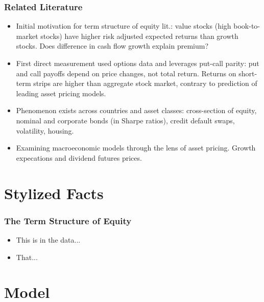 \begin{frame}
  \frametitle{Related Literature}
  \begin{itemize}
  \item Initial motivation for term structure of equity lit.: value stocks (high book-to-market stocks) have higher risk adjusted expected returns than growth stocks. Does difference in cash flow growth explain premium?
  \\ 
  \item First direct measurement used options data and leverages put-call parity: put and call payoffs depend on price changes, not total return. Returns on short-term strips are higher than aggregate stock market, contrary to prediction of leading asset pricing models.
  \\ 
  \item Phenomenon exists across countries and asset classes: cross-section of equity, nominal and corporate bonds (in Sharpe ratios), credit default swaps, volatility, housing.
  \\ 
  \item Examining macroeconomic models through the lens of asset pricing. Growth expecations and dividend futures prices. 
  \\ 
  \end{itemize}
\end{frame}

\section{Stylized Facts}

\begin{frame}
  \frametitle{The Term Structure of Equity}
  \begin{itemize}
  \item This is in the data...
  \item That...
  \end{itemize}
\label{slide:stylized_facts}
\end{frame}

\section{Model}


